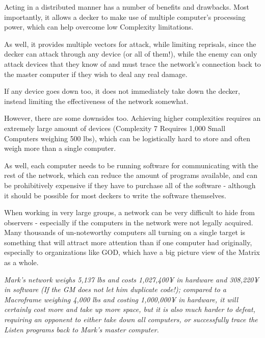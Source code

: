 \begin{multicols}{3}
	Acting in a distributed manner has a number of benefits and drawbacks. Most importantly, it allows a decker to make use of multiple computer's processing power, which can help overcome low Complexity limitations. 
	
	As well, it provides multiple vectors for attack, while limiting reprisals, since the decker can attack through any device (or all of them!), while the enemy can only attack devices that they know of and must trace the network's connection back to the master computer if they wish to deal any real damage. 
	
	If any device goes down too, it does not immediately take down the decker, instead limiting the effectiveness of the network somewhat.
	
	However, there are some downsides too. Achieving higher complexities requires an extremely large amount of devices (Complexity 7 Requires 1,000 Small Computers weighing 500 lbs), which can be logistically hard to store and often weigh more than a single computer. 
	
	As well, each computer needs to be running software for communicating with the rest of the network, which can reduce the amount of programs available, and can be prohibitively expensive if they have to purchase all of the software - although it should be possible for most deckers to write the software themselves. 
	
	When working in very large groups, a network can be very difficult to hide from observers - especially if the computers in the network were not legally acquired. Many thousands of un-noteworthy computers all turning on a single target is something that will attract more attention than if one computer had originally, especially to organizations like GOD, which have a big picture view of the Matrix as a whole.
	
	\textit{\textcolor{OliveGreen}{Mark's network weighs 5,137 lbs and costs 1,027,400¥ in hardware and 308,220¥ in software (If the GM does not let him duplicate code!); compared to a Macroframe weighing 4,000 lbs and costing 1,000,000¥ in hardware, it will certainly cost more and take up more space, but it is also much harder to defeat, requiring an opponent to either take down all computers, or successfully trace the Listen programs back to Mark's master computer.}}
		
	\end{multicols}
